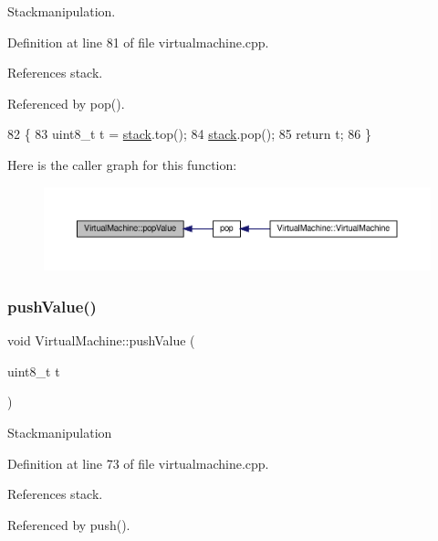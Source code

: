 Stackmanipulation. 

Definition at line 81 of file virtualmachine.\+cpp.



References stack.



Referenced by pop().


\begin{DoxyCode}
82 \{
83     uint8\_t t = \mbox{\hyperlink{class_virtual_machine_a3a4c8cdda0913c9c0cdc75df23ac7cbb}{stack}}.top();
84     \mbox{\hyperlink{class_virtual_machine_a3a4c8cdda0913c9c0cdc75df23ac7cbb}{stack}}.pop();
85     \textcolor{keywordflow}{return} t;
86 \}
\end{DoxyCode}
Here is the caller graph for this function\+:
\nopagebreak
\begin{figure}[H]
\begin{center}
\leavevmode
\includegraphics[width=350pt]{class_virtual_machine_a4cbf0a06938ad9b3acb9a1872452e6a5_icgraph}
\end{center}
\end{figure}
\mbox{\label{class_virtual_machine_ac20f1d6667434866f50880187c521cd4}} 
\subsubsection{\texorpdfstring{push\+Value()}{pushValue()}}
{\footnotesize\ttfamily void Virtual\+Machine\+::push\+Value (\begin{DoxyParamCaption}\item[{uint8\+\_\+t}]{t }\end{DoxyParamCaption})}

Stackmanipulation 

Definition at line 73 of file virtualmachine.\+cpp.



References stack.



Referenced by push().


